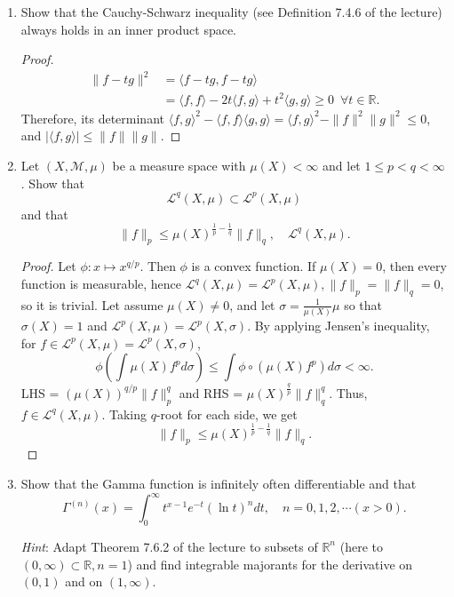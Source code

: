 \documentclass{article}
\begin{document}
\begin{enumerate}[font = \Large\bfseries\itshape\space, leftmargin = 3mm, labelsep = 3mm]
\item
Show that the Cauchy-Schwarz inequality (see Definition 7.4.6 of the lecture) always holds in an inner product space.
\begin{proof}
$$
\begin{aligned}
\|f-tg\|^2
&= \langle f-tg, f-tg \rangle\\
&= \langle f,f \rangle - 2t\langle f,g \rangle + t^2 \langle g,g \rangle \geq 0 \enspace \forall t \in \mathbb{R}.
\end{aligned}
$$
Therefore, its determinant $\langle f,g \rangle^2 - \langle f,f\rangle \langle g,g \rangle = \langle f,g \rangle^2 -\|f\|^2\|g\|^2  \leq 0$, and
$|\langle f,g \rangle| \leq \|f\|\|g\|$.
\end{proof}

\item
Let $(X,\mathcal{M}, \mu)$ be a measure space with $\mu(X) < \infty$ and let $1 \leq p < q < \infty$.
Show that
$$
\mathcal{L}^q(X, \mu) \subset \mathcal{L}^p(X,\mu)
$$
and that
$$
\|f\|_p \leq \mu(X)^{\frac{1}{p} - \frac{1}{q}}\|f\|_q, \quad \mathcal{L}^q(X,\mu).
$$
\begin{proof}
Let $\phi : x \mapsto x^{q/p}$.
Then $\phi$ is a convex function.
If $\mu(X) = 0$, then every function is measurable, hence $\mathcal{L}^q(X,\mu) = \mathcal{L}^p(X,\mu), \|f\|_p = \|f\|_q = 0$, so it is trivial.
Let assume $\mu(X) \neq 0$, and let $\sigma = \frac{1}{\mu(X)}\mu$ so that $\sigma(X) = 1$ and $\mathcal{L}^p(X,\mu) = \mathcal{L}^p(X,\sigma)$.
By applying Jensen's inequality, for $f \in \mathcal{L}^p(X,\mu) = \mathcal{L}^p(X,\sigma)$,
$$
\phi\left( \int \mu(X)f^p d\sigma\right) \leq \int \phi \circ \left(\mu(X) f^p\right) d\sigma < \infty.
$$
LHS = $\left(\mu(X)\right)^{q/p} \|f\|_p^q$ and RHS = $\mu(X)^{\frac{q}{p}} \|f\|_q^q$.
Thus, $f \in \mathcal{L}^q(X,\mu)$.
Taking $q$-root for each side, we get
$$
\|f\|_p \leq \mu(X)^{\frac 1p - \frac 1q} \|f\|_q.
$$
\end{proof}

\item
Show that the Gamma function is infinitely often differentiable and that
$$
\Gamma^{(n)}(x) = \int_0^\infty t^{x-1}e^{-t}(\ln t)^n dt, \quad n = 0,1,2,\cdots (x > 0).
$$

\textit{Hint}: Adapt Theorem 7.6.2 of the lecture to subsets of $\mathbb{R}^n$
(here to $(0,\infty) \subset \mathbb{R}, n = 1$) and
find integrable majorants for the derivative on $(0, 1)$ and on $(1, \infty)$.


\end{enumerate}
\end{document}

